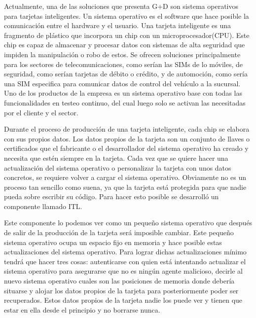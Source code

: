 \documentclass[12pt]{article}
\begin{document}
    \vspace{4mm}
    
    Actualmente, una de las soluciones que presenta G+D son sistema operativos para tarjetas inteligentes. Un sistema operativo es el software que hace posible la comunicación entre el hardware y el usuario. Una tarjeta inteligente es una fragmento de plástico que incorpora un chip con un microprocesador(CPU). Este chip es capaz de almacenar y procesar datos con sistemas de alta seguridad que impiden la manipulación o robo de estos. Se ofrecen soluciones principalmente para los sectores de telecomunicaciones, como serían las SIMs de lo móviles, de seguridad, como serían tarjetas de débito o crédito, y de automoción, como sería una SIM especifica para comunicar datos de control del vehículo a la sucursal. Uno de los productos de la empresa es un sistema operativo base con todas las funcionalidades en testeo continuo, del cual luego solo se activan las necesitadas por el cliente y el sector.
    
    \vspace{4mm}
    
    Durante el proceso de producción de una tarjeta inteligente, cada chip se elabora con sus propios datos. Los datos propios de la tarjeta son un conjunto de llaves o certificados que el fabricante o el desarrollador del sistema operativo ha creado y necesita que estén siempre en la tarjeta. Cada vez que se quiere hacer una actualización del sistema operativo o personalizar la tarjeta con unos datos concretos, se requiere volver a cargar el sistema operativo. Obviamente no es un proceso tan sencillo como suena, ya que la tarjeta está protegida para que nadie pueda sobre escribir su código. Para hacer esto posible se desarrolló un componente llamado ITL. 
    
    \vspace{4mm}
    \clearpage
    Este componente lo podemos ver como un pequeño sistema operativo que después de salir de la producción de la tarjeta será imposible cambiar. Este pequeño sistema operativo ocupa un espacio fijo en memoria y hace posible estas actualizaciones del sistema operativo. Para lograr dichas actualizaciones mínimo tendrá que hacer tres cosas: autenticarse con quien está intentando actualizar el sistema operativo para asegurarse que no es ningún agente malicioso, decirle al nuevo sistema operativo cuales son las posiciones de memoria donde debería situarse y alojar los datos propios de la tarjeta para posteriormente poder ser recuperados. Estos datos propios de la tarjeta nadie los puede ver y tienen que estar en ella desde el principio y no borrarse nunca. 
    
\end{document}
